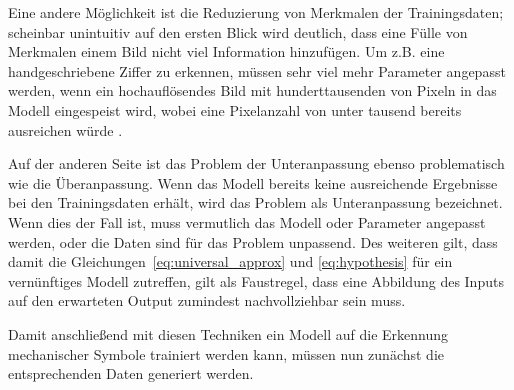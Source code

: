 Eine andere Möglichkeit ist die Reduzierung von Merkmalen der Trainingsdaten; scheinbar unintuitiv auf den ersten Blick wird deutlich, dass eine Fülle von Merkmalen einem Bild nicht viel Information hinzufügen. Um z.B. eine handgeschriebene Ziffer zu erkennen, müssen sehr viel mehr Parameter angepasst werden, wenn ein hochauflösendes Bild mit hunderttausenden von Pixeln in das Modell eingespeist wird, wobei eine Pixelanzahl von unter tausend bereits ausreichen würde \cite{Nielsen2015}.

Auf der anderen Seite ist das Problem der Unteranpassung ebenso problematisch wie die Überanpassung.
Wenn das Modell bereits keine ausreichende Ergebnisse bei den Trainingsdaten erhält, wird das Problem als Unteranpassung bezeichnet.
Wenn dies der Fall ist, muss vermutlich das Modell oder Parameter angepasst werden, oder die Daten sind für das Problem unpassend.
Des weiteren gilt, dass damit die Gleichungen~\eqref{eq:universal_approx} und \eqref{eq:hypothesis} für ein vernünftiges Modell zutreffen, gilt als Faustregel, dass eine Abbildung des Inputs auf den erwarteten Output zumindest nachvollziehbar sein muss.

Damit anschließend mit diesen Techniken ein Modell auf die Erkennung mechanischer Symbole trainiert werden kann, müssen nun zunächst die entsprechenden Daten generiert werden.
